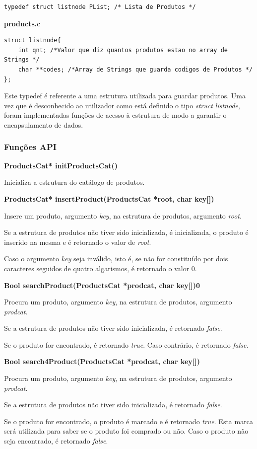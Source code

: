 \documentclass[10pt] {article}
\begin{document}
\begin{lstlisting}
typedef struct listnode PList; /* Lista de Produtos */
\end{lstlisting}
\textbf{products.c}
\begin{lstlisting}
struct listnode{
	int qnt; /*Valor que diz quantos produtos estao no array de Strings */
	char **codes; /*Array de Strings que guarda codigos de Produtos */
};
\end{lstlisting}

\par Este typedef é referente a uma estrutura utilizada para guardar produtos. Uma vez que é desconhecido ao
utilizador como está definido o tipo \emph{struct listnode}, foram implementadas funções de acesso à estrutura
de modo a garantir o encapsulamento de dados.

\subsubsection{Funções API}

\noindent \textbf{ProductsCat* initProductsCat()}
\par Inicializa a estrutura do catálogo de produtos.

\noindent \textbf{ProductsCat* insertProduct(ProductsCat *root, char key[])}
\par Insere um produto, argumento \emph{key}, na estrutura de produtos, argumento \emph{root}.
\par Se a estrutura de produtos não tiver sido inicializada, é inicializada, o produto é inserido na mesma e é retornado o valor de \emph{root}.
\par Caso o argumento \emph{key} seja inválido, isto é, se não for constituído por dois caracteres seguidos de quatro algarismos, é retornado o valor 0.

\noindent \textbf{Bool searchProduct(ProductsCat *prodcat, char key[])0}
\par Procura um produto, argumento \emph{key}, na estrutura de produtos, argumento \emph{prodcat}.
\par Se a estrutura de produtos não tiver sido inicializada, é retornado \emph{false}.
\par Se o produto for encontrado, é retornado \emph{true}. Caso contrário, é retornado \emph{false}.

\noindent \textbf{Bool search4Product(ProductsCat *prodcat, char key[])}
\par Procura um produto, argumento \emph{key}, na estrutura de produtos, argumento \emph{prodcat}.
\par Se a estrutura de produtos não tiver sido inicializada, é retornado \emph{false}.
\par Se o produto for encontrado, o produto é marcado e é retornado \emph{true}. Esta marca será utilizada para saber se o produto foi comprado ou não. Caso o produto não seja encontrado, é retornado \emph{false}.
\end{document}

